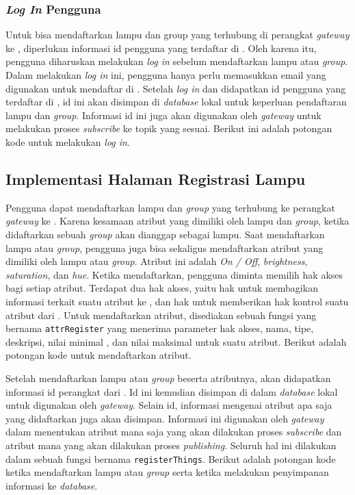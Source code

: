 \subsubsection{\textit{Log In} Pengguna}
Untuk bisa mendaftarkan lampu dan group yang terhubung di perangkat \textit{gateway} ke \plat, diperlukan informasi id pengguna yang terdaftar di \plat. Oleh karena itu, pengguna diharuskan melakukan \textit{log in} sebelum mendaftarkan lampu atau \textit{group}. Dalam melakukan \textit{log in} ini, pengguna hanya perlu memasukkan email yang digunakan untuk mendaftar di \plat. Setelah \textit{log in} dan didapatkan id pengguna yang terdaftar di \plat, id ini akan disimpan di \textit{database} lokal untuk keperluan pendaftaran lampu dan \textit{group}. Informasi id ini juga akan digunakan oleh \textit{gateway} untuk melakukan proses \textit{subscribe} ke topik yang sesuai. Berikut ini adalah potongan kode untuk melakukan \textit{log in}.



\subsection{Implementasi Halaman Registrasi Lampu}
Pengguna dapat mendaftarkan lampu dan \textit{group} yang terhubung ke perangkat \textit{gateway} ke \plat. Karena kesamaan atribut yang dimiliki oleh lampu dan \textit{group}, ketika didaftarkan sebuah \textit{group} akan dianggap sebagai lampu. Saat mendaftarkan lampu atau \textit{group}, pengguna juga bisa sekaligus mendaftarkan atribut yang dimiliki oleh lampu atau \textit{group}. Atribut ini adalah \textit{On / Off}, \textit{brightness}, \textit{saturation}, dan \textit{hue}. Ketika mendaftarkan, pengguna diminta memilih hak akses bagi setiap atribut. Terdapat dua hak akses, yaitu hak untuk membagikan informasi terkait suatu atribut ke \plat, dan hak untuk memberikan hak kontrol suatu atribut dari \plat. Untuk mendaftarkan atribut, disediakan sebuah fungsi yang bernama \texttt{attrRegister} yang menerima parameter hak akses, nama, tipe, deskripsi, nilai minimal , dan nilai maksimal untuk suatu atribut. Berikut adalah potongan kode untuk mendaftarkan atribut.



Setelah mendaftarkan lampu atau \textit{group} beserta atributnya, akan didapatkan informasi id perangkat dari \plat. Id ini kemudian disimpan di dalam \textit{database} lokal untuk digunakan oleh \textit{gateway}. Selain id, informasi mengenai atribut apa saja yang didaftarkan juga akan disimpan. Informasi ini digunakan oleh \textit{gateway} dalam menentukan atribut mana saja yang akan dilakukan proses \textit{subscribe} dan atribut mana yang akan dilakukan proses \textit{publishing}. Seluruh hal ini dilakukan dalam sebuah fungsi bernama \texttt{registerThings}. Berikut adalah potongan kode ketika mendaftarkan lampu atau \textit{group} serta ketika melakukan penyimpanan informasi ke \textit{database}.

